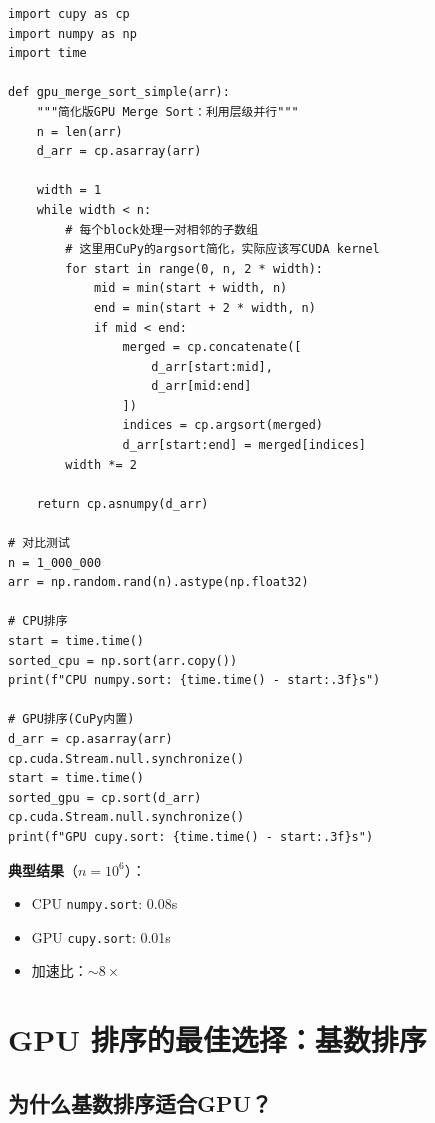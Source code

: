 \documentclass[12pt, a4paper]{ctexart}
\begin{document}
\begin{experiment}
\begin{lstlisting}
import cupy as cp
import numpy as np
import time

def gpu_merge_sort_simple(arr):
    """简化版GPU Merge Sort：利用层级并行"""
    n = len(arr)
    d_arr = cp.asarray(arr)
    
    width = 1
    while width < n:
        # 每个block处理一对相邻的子数组
        # 这里用CuPy的argsort简化，实际应该写CUDA kernel
        for start in range(0, n, 2 * width):
            mid = min(start + width, n)
            end = min(start + 2 * width, n)
            if mid < end:
                merged = cp.concatenate([
                    d_arr[start:mid], 
                    d_arr[mid:end]
                ])
                indices = cp.argsort(merged)
                d_arr[start:end] = merged[indices]
        width *= 2
    
    return cp.asnumpy(d_arr)

# 对比测试
n = 1_000_000
arr = np.random.rand(n).astype(np.float32)

# CPU排序
start = time.time()
sorted_cpu = np.sort(arr.copy())
print(f"CPU numpy.sort: {time.time() - start:.3f}s")

# GPU排序(CuPy内置)
d_arr = cp.asarray(arr)
cp.cuda.Stream.null.synchronize()
start = time.time()
sorted_gpu = cp.sort(d_arr)
cp.cuda.Stream.null.synchronize()
print(f"GPU cupy.sort: {time.time() - start:.3f}s")
\end{lstlisting}

\textbf{典型结果}（$n = 10^6$）：
\begin{itemize}
    \item CPU \texttt{numpy.sort}: 0.08s
    \item GPU \texttt{cupy.sort}: 0.01s
    \item 加速比：$\sim 8\times$
\end{itemize}
\end{experiment}

\section{GPU 排序的最佳选择：基数排序}

\subsection{为什么基数排序适合GPU？}
\end{document}
